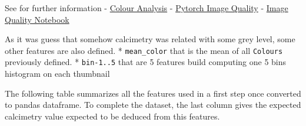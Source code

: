 \documentclass[11pt]{article}
\begin{document}
See for further information -
\href{https://towardsdatascience.com/building-an-image-color-analyzer-using-python-12de6b0acf74}{Colour
Analysis} -
\href{https://github.com/photosynthesis-team/piq/blob/master/examples/image_metrics.py}{Pytorch
Image Quality} - \href{../notebooks/image-quality-talk.ipynb}{Image
Quality Notebook}

As it was guess that somehow calcimetry was related with some grey
level, some other features are also defined. * \texttt{mean\_color} that
is the mean of all \texttt{Colours} previously defined. *
\texttt{bin-1..5} that are 5 features build computing one 5 bins
histogram on each thumbnail

The following table summarizes all the features used in a first step
once converted to pandas dataframe. To complete the dataset, the last
column gives the expected calcimetry value expected to be deduced from
this features.
\end{document}
